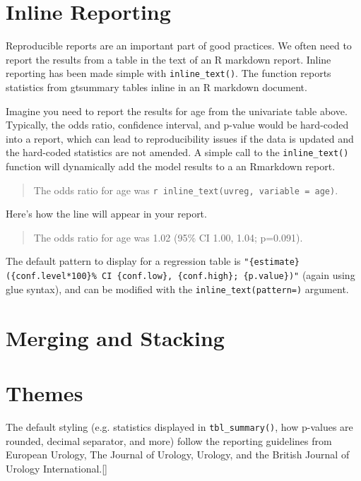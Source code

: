 \section{Inline Reporting}\label{in-line-reporting}

Reproducible reports are an important part of good practices.
We often need to report the results from a table in the text of an R markdown report.
Inline reporting has been made simple with \texttt{inline\_text()}.
The function reports statistics from gtsummary tables inline in an R markdown document.

Imagine you need to report the results for age from the univariate table above.
Typically, the odds ratio, confidence interval, and p-value would be hard-coded into a report, which can lead to reproducibility issues if the data is updated and the hard-coded statistics are not amended.
A simple call to the \texttt{inline\_text()} function will dynamically add the model results to a an Rmarkdown report.

\begin{quote}
The odds ratio for age was \texttt{\textasciigrave{}r\ inline\_text(uvreg,\ variable\ =\ age)\textasciigrave{}}.
\end{quote}

Here's how the line will appear in your report.

\begin{quote}
The odds ratio for age was 1.02 (95\% CI 1.00, 1.04; p=0.091).
\end{quote}

The default pattern to display for a regression table is \texttt{"\{estimate\} (\{conf.level*100\}\% CI \{conf.low\}, \{conf.high\}; \{p.value\})"} (again using glue syntax), and can be modified with the \texttt{inline\_text(pattern=)} argument. 

\section{Merging and Stacking}\label{merging-and-stacking}

\section{Themes}\label{themes}

The default styling (e.g. statistics displayed in \texttt{tbl\_summary()}, how p-values are rounded, decimal separator, and more) follow the reporting guidelines from European Urology, The Journal of Urology, Urology, and the British Journal of Urology International.[]

